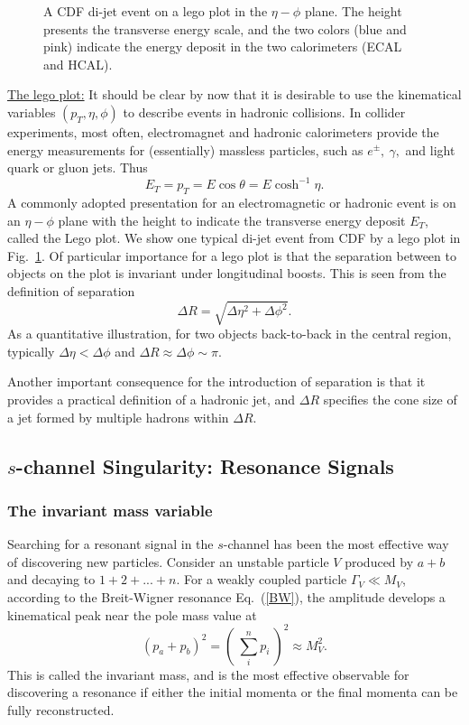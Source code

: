 \documentclass[12pt,prd,aps,floats,preprintnumbers,preprint,superscriptaddress,floatfix,nofootinbib]{revtex4}
\def\pt{p_T^{}}
\def\et{E_T^{}}
\def\be{\begin{equation}}
\def\ee{\end{equation}}
\begin{document}
\begin{center}
\begin{figure}[tb]
\caption{A  CDF di-jet event on a  lego plot in the $\eta-\phi$ plane. 
The height presents the transverse energy scale, and the two colors
(blue and pink) indicate the energy deposit in the two calorimeters
(ECAL and HCAL).
\label{fig:lego}}
\end{figure}
\end{center}

\vskip 0.2cm
\noindent
\underline{The lego plot:} 
It should be clear by now that it is desirable to use the kinematical variables 
$(\pt,\eta,\phi)$ to describe events in hadronic collisions.
%
In collider experiments, most often, electromagnet and hadronic calorimeters
provide the energy measurements for (essentially) massless particles, such
as $e^\pm,\ \gamma,$ and light quark or gluon jets. Thus
\be
\et = \pt = E\cos\theta = E\cosh^{-1}\eta.
\ee
A commonly adopted presentation for an electromagnetic or hadronic event
is on an  $\eta-\phi$ plane with the height to indicate the transverse energy
deposit $\et$, called the Lego plot. We show one typical  di-jet event from CDF 
by a lego plot in Fig.~\ref{fig:lego}. Of particular importance for a lego plot 
is that the separation between to objects on the plot is invariant under longitudinal 
boosts. This is seen from the definition of separation
\be
\Delta R= \sqrt{ \Delta\eta^2 + \Delta\phi^2}.
\ee
As a quantitative illustration, for two objects back-to-back in the central region, 
typically $\Delta\eta < \Delta\phi$ and $\Delta R \approx \Delta\phi\sim \pi$.

Another important consequence for the introduction of separation is that it
provides a practical definition of a hadronic jet, and $\Delta R$ specifies the 
cone size of a jet formed by multiple hadrons within $\Delta R$.

\subsection{$s$-channel Singularity: Resonance Signals}

\subsubsection{The invariant mass variable}

Searching for a resonant signal in the $s$-channel has been the most
effective way of discovering new particles. Consider an unstable particle
$V$ produced by $a+b$ and decaying to $1+2+...+n$. For a weakly coupled
particle $\Gamma_V \ll M_V$, according to the Breit-Wigner resonance
Eq.~(\ref{BW}), the amplitude develops a kinematical peak near
the pole mass value at 
\be
(p_a+p_b)^2 = (\ \sum_i^np_i \ )^2 \approx M_V^2.
\ee
This is called the invariant mass, and is the most effective observable 
for discovering a resonance if either the initial momenta or the final
momenta can be fully reconstructed. 
\end{document}
